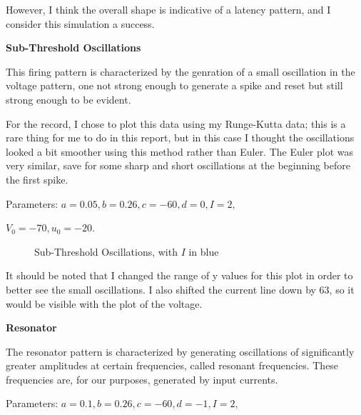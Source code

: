 \documentclass[a4paper,12pt]{article}
\begin{document}
\vspace{2mm}

However, I think the overall shape is indicative of a latency pattern, and I consider this simulation a success. 

\vfil\eject

{\bf Sub-Threshold Oscillations}
\bigskip

This firing pattern is characterized by the genration of a small oscillation in the voltage pattern, one not strong enough to generate a spike and reset but still strong enough to be evident. 

\vspace{2mm}

For the record, I chose to plot this data using my Runge-Kutta data; this is a rare thing for me to do in this report, but in this case I thought the oscillations looked a bit smoother using this method rather than Euler. The Euler plot was very similar, save for some sharp and short oscillations at the beginning before the first spike. 

\vspace{2mm} 

Parameters: $a=0.05, b=0.26, c=-60, d=0, I=2, $

\vspace{1mm}

$V_{0}=-70, u_{0}=-20$. 

\begin{figure}[h!]
\begin{center}
\end{center}
\caption{\label{pict10}Sub-Threshold Oscillations, with $I$ in blue}
\end{figure}

It should be noted that I changed the range of y values for this plot in order to better see the small oscillations. I also shifted the current line down by 63, so it would be visible with the plot of the voltage. 

\vfil\eject

{\bf Resonator}
\bigskip

The resonator pattern is characterized by generating oscillations of significantly greater amplitudes at certain frequencies, called resonant frequencies. These frequencies are, for our purposes, generated by input currents. 

\vspace{2mm}

Parameters: $a=0.1, b=0.26, c=-60, d=-1, I=2, $
\end{document}
